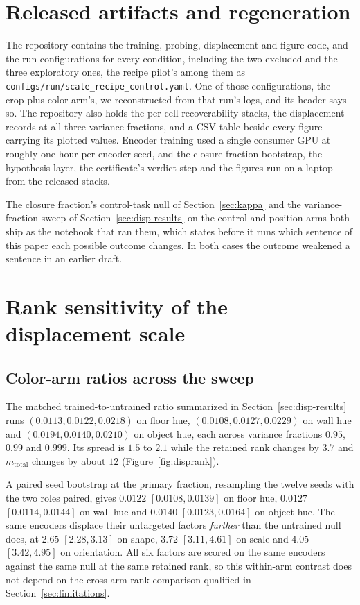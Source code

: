\documentclass[10pt]{article}
\begin{document}
\section{Released artifacts and regeneration}
\label{app:artifacts}
The repository contains the training, probing, displacement and figure code, and the run
configurations for every condition, including the two excluded and the three exploratory ones, the
recipe pilot's among them as \texttt{configs/run/scale\_recipe\_control.yaml}. One of those
configurations, the crop-plus-color arm's, we reconstructed from that run's logs, and its header
says
so. The repository also holds the per-cell recoverability stacks, the displacement records at all
three variance fractions, and a CSV table beside every figure carrying its plotted values. Encoder
training used a single consumer GPU at roughly one hour per encoder seed, and the closure-fraction
bootstrap, the hypothesis layer, the certificate's verdict step and the figures run on a laptop from
the released stacks.

The closure fraction's control-task null of Section~\ref{sec:kappa} and the variance-fraction sweep
of Section~\ref{sec:disp-results} on the control and position arms both ship as the notebook that
ran them, which states before it runs which sentence of this paper each possible outcome changes. In
both cases the outcome weakened a sentence in an earlier draft.

\section{Rank sensitivity of the displacement scale}
\label{app:sweep}
\subsection*{Color-arm ratios across the sweep}
The matched trained-to-untrained ratio summarized in Section~\ref{sec:disp-results} runs
$(0.0113, 0.0122, 0.0218)$ on floor hue, $(0.0108, 0.0127, 0.0229)$ on wall hue and
$(0.0194, 0.0140, 0.0210)$ on object hue, each across variance fractions $0.95$, $0.99$ and
$0.999$. Its spread is $1.5$ to $2.1$ while
the retained rank changes by $3.7$ and $m_{\mathrm{total}}$ changes by about $12$
(Figure~\ref{fig:disprank}).

A paired seed bootstrap at the primary fraction, resampling the twelve seeds with the two roles
paired, gives $0.0122$ $[0.0108, 0.0139]$ on floor hue, $0.0127$ $[0.0114, 0.0144]$ on wall hue and
$0.0140$ $[0.0123, 0.0164]$ on object hue. The same encoders displace their untargeted factors
\emph{further} than the untrained null does, at $2.65$ $[2.28, 3.13]$ on shape, $3.72$ $[3.11,
4.61]$ on scale and $4.05$ $[3.42, 4.95]$ on orientation. All six factors are scored on the same
encoders against the same null at the same retained rank, so this within-arm contrast does not
depend on the cross-arm rank comparison qualified in Section~\ref{sec:limitations}.
\end{document}
